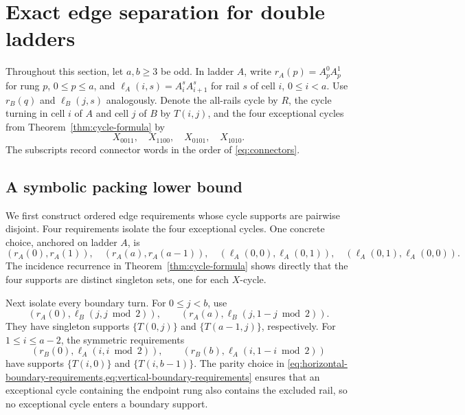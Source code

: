 \section{Exact edge separation for double ladders}
\label{sec:exact-hsep}

Throughout this section, let \(a,b\ge3\) be odd.  In ladder \(A\), write
\(r_A(p)=A_p^0A_p^1\) for rung \(p\), \(0\le p\le a\), and
\(\ell_A(i,s)=A_i^sA_{i+1}^s\) for rail \(s\) of cell \(i\),
\(0\le i<a\).  Use \(r_B(q)\) and \(\ell_B(j,s)\) analogously.  Denote
the all-rails cycle by \(R\), the cycle turning in cell \(i\) of \(A\) and
cell \(j\) of \(B\) by \(T(i,j)\), and the four exceptional cycles from
Theorem~\ref{thm:cycle-formula} by
\[
 X_{0011},\quad X_{1100},\quad X_{0101},\quad X_{1010}.
\]
The subscripts record connector words in the order of \cref{eq:connectors}.

\subsection{A symbolic packing lower bound}

We first construct ordered edge requirements whose cycle supports are
pairwise disjoint.  Four requirements isolate the four exceptional cycles.
One concrete choice, anchored on ladder \(A\), is
\begin{equation}
\label{eq:exception-requirements}
 (r_A(0),r_A(1)),\quad (r_A(a),r_A(a-1)),\quad
 (\ell_A(0,0),\ell_A(0,1)),\quad
 (\ell_A(0,1),\ell_A(0,0)).
\end{equation}
The incidence recurrence in Theorem~\ref{thm:cycle-formula} shows directly that the
four supports are distinct singleton sets, one for each \(X\)-cycle.

Next isolate every boundary turn.  For \(0\le j<b\), use
\begin{equation}
\label{eq:horizontal-boundary-requirements}
 (r_A(0),\ell_B(j,j\bmod2)),\qquad
 (r_A(a),\ell_B(j,1-j\bmod2)).
\end{equation}
They have singleton supports \(\{T(0,j)\}\) and
\(\{T(a-1,j)\}\), respectively.  For \(1\le i\le a-2\), the symmetric
requirements
\begin{equation}
\label{eq:vertical-boundary-requirements}
 (r_B(0),\ell_A(i,i\bmod2)),\qquad
 (r_B(b),\ell_A(i,1-i\bmod2))
\end{equation}
have supports \(\{T(i,0)\}\) and \(\{T(i,b-1)\}\).  The parity choice in
\cref{eq:horizontal-boundary-requirements,eq:vertical-boundary-requirements}
ensures that an exceptional cycle containing the endpoint rung also contains
the excluded rail, so no exceptional cycle enters a boundary support.

